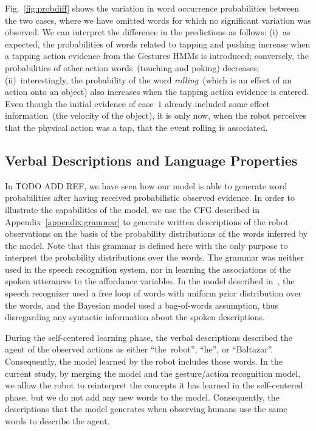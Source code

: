 Fig.~\ref{fig:probdiff} shows the variation in word occurrence probabilities between the two cases, where we have omitted words for which no significant variation was observed.
We can interpret the difference in the predictions as follows: (i)~as expected, the probabilities of words related to tapping and pushing increase when a tapping action evidence from the Gestures \acp{HMM} is introduced; conversely, the probabilities of other action words~(touching and poking) decreases; (ii)~interestingly, the probability of the word \emph{rolling}~(which is an effect of an action onto an object) also increases when the tapping action evidence is entered. Even though the initial evidence of case~$1$ already included some effect information~(the velocity of the object), it is only now, when the robot perceives that the physical action was a tap, that the event rolling is associated.

\subsection{Verbal Descriptions and Language Properties}

In TODO ADD REF, we have seen how our model is able to generate word probabilities after having received probabilistic observed evidence.
In order to illustrate the capabilities of the model, we use the \ac{CFG} described in Appendix~\ref{appendix:grammar} to generate written descriptions of the robot observations on the basis of the probability distributions of the words inferred by the model.
Note that this grammar is defined here with the only purpose to interpret the probability distributions over the words.
The grammar was neither used in the speech recognition system, nor in learning the associations of the spoken utterances to the affordance variables.
In the model described in~\cite{salvi:2012:smcb}, the speech recognizer used a free loop of words with uniform prior distribution over the words, and the Bayesian model used a bag-of-words assumption, thus disregarding any syntactic information about the spoken descriptions.

During the self-centered learning phase, the verbal descriptions described the agent of the observed actions as either ``the~robot'', ``he'', or ``Baltazar''.
Consequently, the \AffWords{} model learned by the robot includes those words.
In the current study, by merging the \AffWords{} model and the gesture/action recognition model, we allow the robot to reinterpret the concepts it has learned in the self-centered phase, but we do not add any new words to the model.
Consequently, the descriptions that the model generates when observing humans use the same words to describe the agent.

